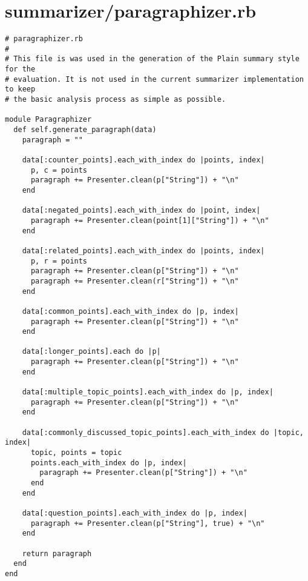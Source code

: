 \documentclass{article}
\begin{document}
\section*{summarizer/paragraphizer.rb}
\begin{verbatim}
# paragraphizer.rb
#
# This file is was used in the generation of the Plain summary style for the
# evaluation. It is not used in the current summarizer implementation to keep
# the basic analysis process as simple as possible.

module Paragraphizer
  def self.generate_paragraph(data)
    paragraph = ""

    data[:counter_points].each_with_index do |points, index|
      p, c = points
      paragraph += Presenter.clean(p["String"]) + "\n"
    end

    data[:negated_points].each_with_index do |point, index|
      paragraph += Presenter.clean(point[1]["String"]) + "\n"
    end

    data[:related_points].each_with_index do |points, index|
      p, r = points
      paragraph += Presenter.clean(p["String"]) + "\n"
      paragraph += Presenter.clean(r["String"]) + "\n"
    end

    data[:common_points].each_with_index do |p, index|
      paragraph += Presenter.clean(p["String"]) + "\n"
    end

    data[:longer_points].each do |p|
      paragraph += Presenter.clean(p["String"]) + "\n"
    end

    data[:multiple_topic_points].each_with_index do |p, index|
      paragraph += Presenter.clean(p["String"]) + "\n"
    end

    data[:commonly_discussed_topic_points].each_with_index do |topic, index|
      topic, points = topic
      points.each_with_index do |p, index|
        paragraph += Presenter.clean(p["String"]) + "\n"
      end
    end

    data[:question_points].each_with_index do |p, index|
      paragraph += Presenter.clean(p["String"], true) + "\n"
    end

    return paragraph
  end
end


\end{verbatim}
\pagebreak
\end{document}
